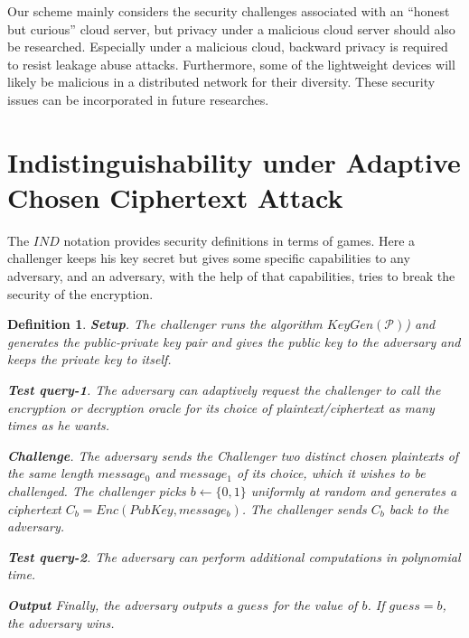 \documentclass[sigconf,pdftex]{acmart}
\newtheorem{definition}{Definition}[]
\begin{document}
Our scheme mainly considers the security challenges associated with an ``honest but curious'' cloud server, but privacy under a malicious cloud server should also be researched. Especially under a malicious cloud,  backward privacy is required to resist leakage abuse attacks. Furthermore, some of the lightweight devices will likely be malicious in a distributed network for their diversity. These security issues can be incorporated in future researches.








\appendix

\section{Indistinguishability under Adaptive Chosen Ciphertext Attack}\label{ind-cca1}

 
 
 The $IND$ notation provides security definitions in terms of games. Here a challenger keeps his key secret but gives some specific capabilities to any adversary, and an adversary, with the help of that capabilities, tries to break the security of the encryption. 
 
 \begin{definition}
  
  \textbf{\textit{Setup}}. The challenger runs the algorithm $KeyGen(\mathcal{P})$) and generates the public-private key pair and gives the public key to the adversary and keeps the private key to itself.
  
  \textbf{\textit{Test query-1}}. The adversary can adaptively request the challenger to call the encryption or decryption oracle for its choice of plaintext/ciphertext as many times as he wants.
  

\textbf{\textit{Challenge}}. The adversary sends the Challenger two distinct chosen plaintexts of the same length $message_0$ and $message_1$ of its choice, which it wishes to be challenged. The challenger picks $b\leftarrow\{0,1\}$ uniformly at random and generates a ciphertext $C_b = Enc(PubKey, message_{b})$. The challenger sends $C_b$ back to the adversary.


\textbf{\textit{Test query-2}}. The adversary can perform additional computations in polynomial time.

\textbf{\textit{Output}}  Finally, the adversary outputs a $guess$ for the value of $b$. If $guess=b$, the adversary wins.


  
 \end{definition}
 
\end{document}
